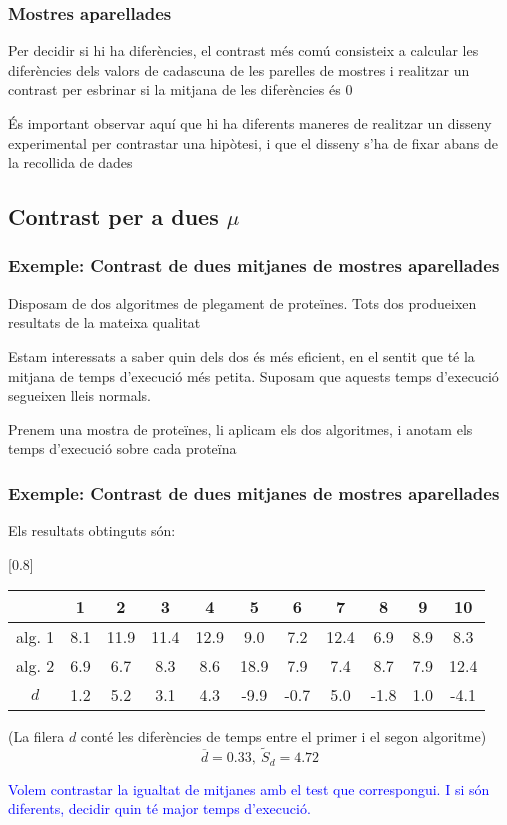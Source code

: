 \documentclass[12pt,t]{beamer}\usepackage[]{graphicx}\usepackage[]{color}
\newcommand{\blue}[1]{\textcolor{blue}{#1}}
\renewcommand{\emph}[1]{{\color{red}#1}}
\theoremstyle{plain}
\theoremstyle{definition}
\begin{document}
\begin{frame}
\frametitle{Mostres aparellades}

Per decidir si hi ha diferències, el contrast més comú consisteix a calcular les diferències
dels valors de cadascuna de les parelles de mostres i realitzar un
contrast per esbrinar si la mitjana de les diferències és  0

\pause \vspace*{1cm}



És important observar aquí que hi ha diferents maneres de
realitzar un disseny experimental per contrastar una hipòtesi, i que el disseny s'ha de fixar abans de la recollida de dades
\end{frame}

\subsection{Contrast  per a dues $\mu$}
\begin{frame}
\frametitle{Exemple: Contrast de dues mitjanes de mostres aparellades}

Disposam de dos algoritmes de plegament de proteïnes. Tots dos
produeixen resultats de la mateixa qualitat
\medskip

Estam interessats a saber quin dels dos és \emph{més eficient}, en el sentit que té la mitjana de temps d'execució
més petita. Suposam que aquests temps d'execució segueixen lleis normals.
\medskip

Prenem una mostra de proteïnes, li aplicam els dos algoritmes, i anotam els temps d'execució sobre cada proteïna
\end{frame}


\begin{frame}
\frametitle{Exemple: Contrast de dues mitjanes de mostres aparellades}
Els resultats obtinguts són:
\begin{table}
\centering
\scalebox{0.80}[0.8]{
\begin{tabular}{c|cccccccccc}
& 1 & 2 & 3 & 4 & 5 & 6 & 7 & 8 & 9 & 10\\
\hline
alg. 1  & 8.1 & 11.9 & 11.4 & 12.9 & 9.0 & 7.2 & 12.4 & 6.9 & 8.9 & 8.3\\
\hline
alg. 2 & 6.9 & 6.7 & 8.3 & 8.6 & 18.9 & 7.9 & 7.4 & 8.7 & 7.9 &
12.4\\
\hline
$d$ & 1.2 & 5.2 & 3.1 & 4.3 & -9.9 & -0.7 & 5.0 & -1.8 &
1.0 & -4.1
\end{tabular}

}
\end{table}
(La filera $d$ conté les diferències de temps entre el primer i el segon algoritme)
$$
\overline{d}=0.33,\ \widetilde{S}_d=4.72
$$
\smallskip

\blue{Volem contrastar la igualtat de mitjanes amb el test que correspongui. I si són diferents, decidir quin té major temps d'execució.}




\end{frame}
\end{document}
